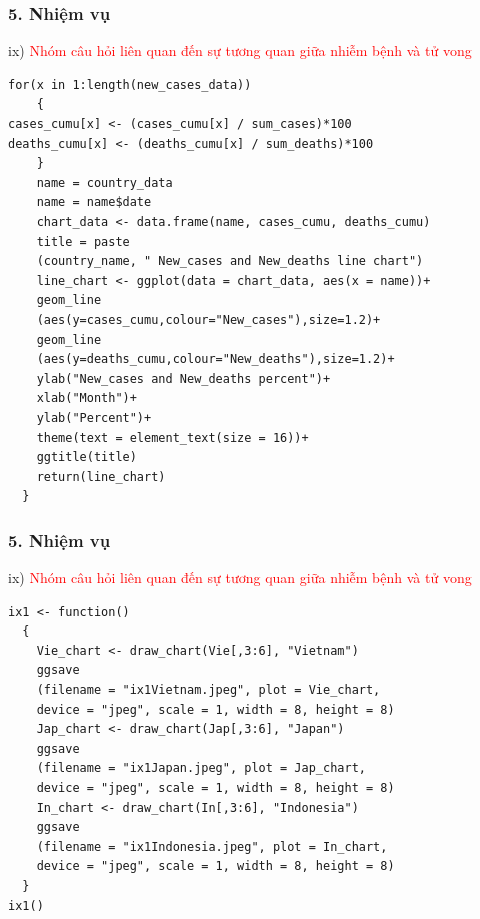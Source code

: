 \documentclass[english,10pt,table]{beamer}
\begin{document}
\begin{frame}[fragile]
\frametitle{5.  Nhiệm vụ}
ix) \textcolor{red}{Nhóm câu hỏi liên quan đến sự tương quan giữa nhiễm bệnh và tử vong}\\
        \begin{lstlisting}[frame = single,basicstyle=\tiny]
    for(x in 1:length(new_cases_data))
    {
cases_cumu[x] <- (cases_cumu[x] / sum_cases)*100
deaths_cumu[x] <- (deaths_cumu[x] / sum_deaths)*100
    }
    name = country_data
    name = name$date
    chart_data <- data.frame(name, cases_cumu, deaths_cumu)
    title = paste
    (country_name, " New_cases and New_deaths line chart")
    line_chart <- ggplot(data = chart_data, aes(x = name))+
    geom_line
    (aes(y=cases_cumu,colour="New_cases"),size=1.2)+
    geom_line
    (aes(y=deaths_cumu,colour="New_deaths"),size=1.2)+
    ylab("New_cases and New_deaths percent")+
    xlab("Month")+
    ylab("Percent")+
    theme(text = element_text(size = 16))+
    ggtitle(title)
    return(line_chart)
  }
        \end{lstlisting}
\end{frame}

\begin{frame}[fragile]
\frametitle{5.  Nhiệm vụ}
ix) \textcolor{red}{Nhóm câu hỏi liên quan đến sự tương quan giữa nhiễm bệnh và tử vong}\\
         \begin{lstlisting}[frame = single,basicstyle=\tiny]
  ix1 <- function()
  {
    Vie_chart <- draw_chart(Vie[,3:6], "Vietnam")
    ggsave
    (filename = "ix1Vietnam.jpeg", plot = Vie_chart, 
    device = "jpeg", scale = 1, width = 8, height = 8)
    Jap_chart <- draw_chart(Jap[,3:6], "Japan")
    ggsave
    (filename = "ix1Japan.jpeg", plot = Jap_chart, 
    device = "jpeg", scale = 1, width = 8, height = 8)
    In_chart <- draw_chart(In[,3:6], "Indonesia")
    ggsave
    (filename = "ix1Indonesia.jpeg", plot = In_chart, 
    device = "jpeg", scale = 1, width = 8, height = 8)
  }
ix1()
        \end{lstlisting}
\end{frame}
\end{document}
